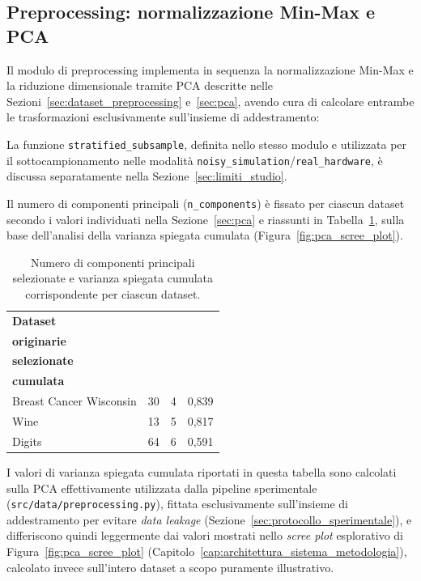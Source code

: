 \subsection{Preprocessing: normalizzazione Min-Max e PCA}
\label{sec:impl_preprocessing}

Il modulo di preprocessing implementa in sequenza la normalizzazione Min-Max e la riduzione dimensionale tramite PCA descritte nelle Sezioni~\ref{sec:dataset_preprocessing} e~\ref{sec:pca}, avendo cura di calcolare entrambe le trasformazioni esclusivamente sull'insieme di addestramento:



La funzione \texttt{stratified\_subsample}, definita nello stesso modulo e utilizzata per il sottocampionamento nelle modalità \texttt{noisy\_simulation}/\texttt{real\_hardware}, è discussa separatamente nella Sezione~\ref{sec:limiti_studio}.

Il numero di componenti principali (\texttt{n\_components}) è fissato per ciascun dataset secondo i valori individuati nella Sezione~\ref{sec:pca} e riassunti in Tabella~\ref{tab:pca_componenti}, sulla base dell'analisi della varianza spiegata cumulata (Figura~\ref{fig:pca_scree_plot}).

\begin{table}[htbp]
\centering
\caption{Numero di componenti principali selezionate e varianza spiegata cumulata corrispondente per ciascun dataset.}
\label{tab:pca_componenti}
\begin{tabular}{lccc}
\toprule
\textbf{Dataset} & \thead{\textbf{Feature} \\ \textbf{originarie}} & \thead{\textbf{Componenti} \\ \textbf{selezionate}} & \thead{\textbf{Varianza spiegata} \\ \textbf{cumulata}} \\
\midrule
Breast Cancer Wisconsin & 30 & 4 & 0,839 \\
Wine & 13 & 5 & 0,817 \\
Digits & 64 & 6 & 0,591 \\
\bottomrule
\end{tabular}

\medskip
{\footnotesize I valori di varianza spiegata cumulata riportati in questa tabella sono calcolati sulla PCA effettivamente utilizzata dalla pipeline sperimentale (\texttt{src/data/preprocessing.py}), fittata esclusivamente sull'insieme di addestramento per evitare \textit{data leakage} (Sezione~\ref{sec:protocollo_sperimentale}), e differiscono quindi leggermente dai valori mostrati nello \textit{scree plot} esplorativo di Figura~\ref{fig:pca_scree_plot} (Capitolo~\ref{cap:architettura_sistema_metodologia}), calcolato invece sull'intero dataset a scopo puramente illustrativo.}
\end{table}

